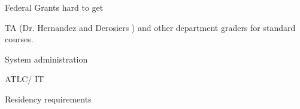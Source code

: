 Federal Grants hard to get

TA (Dr. Hernandez and Derosiers )  and other department
	graders for standard courses. 
	
System administration 

ATLC/ IT 

Residency requirements  